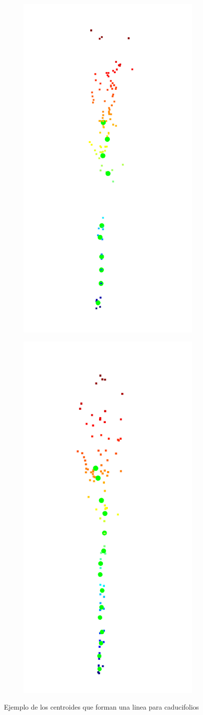 \begin{figure}
  \begin{subfigure}{0.5\textwidth}
    \centering
    \includegraphics[width=0.8\linewidth,height=0.9\linewidth]{imaxes/centroidesCad1.png}
    \label{fig:last1}
  \end{subfigure}%
  \begin{subfigure}{0.5\textwidth}
    \centering
    \includegraphics[width=0.8\linewidth,height=0.9\linewidth]{imaxes/centroidesCad2.png}
    \label{fig:last}
  \end{subfigure}
 \caption{Ejemplo de los centroides que forman una linea para caducifolios}
  \label{fig:algo2}
\end{figure}